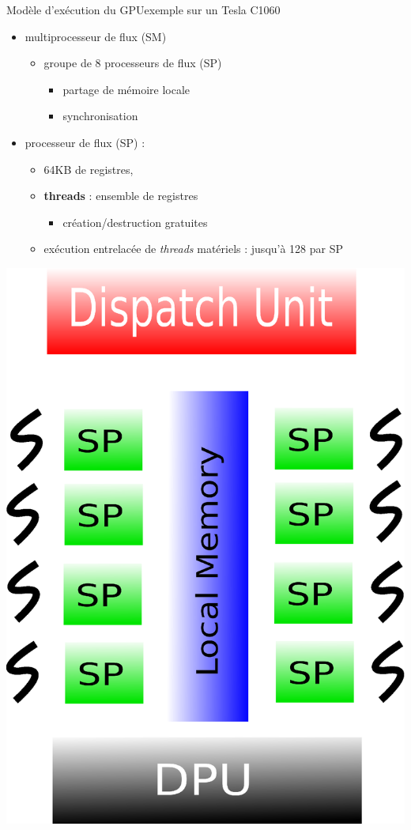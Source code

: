 \documentclass[11pt,mathserif]{beamer}
\begin{document}
\begin{frame}{Modèle d'exécution du GPU}{exemple sur un Tesla C1060}
\begin{minipage}[c]{0.49\linewidth}
\begin{itemize}
  \item multiprocesseur de flux (SM)
    \begin{itemize}
      \item groupe de 8 processeurs de flux (SP)
        \begin{itemize}
          \item partage de mémoire locale
          \item synchronisation
        \end{itemize}
    \end{itemize}
  \item processeur de flux (SP) : 
    \begin{itemize}
    \item 64KB de registres, 
    \item {\bf threads} : ensemble de registres
    \begin{itemize}
      \item création/destruction gratuites
    \end{itemize}
  \item exécution entrelacée de {\em threads} matériels : jusqu'à 128 par SP
    \end{itemize}
\end{itemize}
\end{minipage}
\begin{minipage}[c]{0.49\linewidth}
\begin{center}
  \includegraphics[width=0.6\linewidth]{fig/GPUArchiThread.eps}
\end{center}
\end{minipage}
\end{frame}
\end{document}
